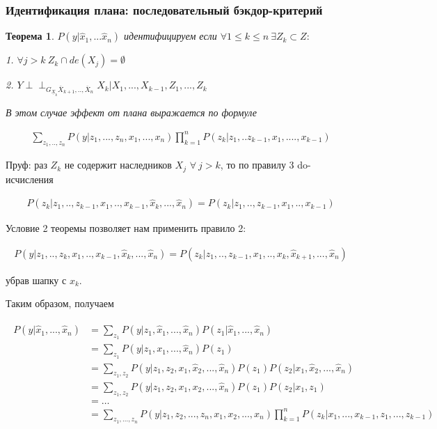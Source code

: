 \documentclass[fleqn]{article}
\newcommand{\independent}{\perp \!\!\! \perp}
\newtheorem{theorem}{Теорема}
\numberwithin{equation}{section}
\numberwithin{theorem}{section}
\numberwithin{figure}{section}
\numberwithin{lemma}{section}
\begin{document}
\subsubsection*{Идентификация плана: последовательный бэкдор-критерий}

\begin{theorem}
	$P(y|\hat x_1, ...\hat x_n)$ идентифицируем если $\forall 1 \le k \le n \ \exists Z_k \subset Z:$ 
	
	1. $ \forall j > k \ Z_k \cap de(X_j) = \emptyset$
	
	2. $Y \independent_{G_{\underline{X}_k}\overline{X}_{k+1},..,\overline{X}_n} X_k | X_1, ..., X_{k-1}, Z_1, ..., Z_k$
	
	В этом случае эффект от плана выражается по формуле 
	
	\begin{align}
		\sum\limits_{z_1,..,z_n}P(y|z_1,...,z_n,x_1,...,x_n)\prod\limits_{k=1}^nP(z_k|z_1,..z_{k-1}, x_1,....,x_{k-1})
	\end{align}
\end{theorem}

Пруф: раз $Z_k$ не содержит наследников $X_j$ $\forall \ j > k$, то по правилу 3 do-исчисления

\begin{align}
	P(z_k|z_1,..,z_{k-1},x_1,..,x_{k-1}, \hat x_k, ...,\hat x_n) = P(z_k|z_1,..,z_{k-1},x_1,..,x_{k-1}) 
\end{align}

Условие 2 теоремы позволяет нам применить правило 2:

\begin{align}
	P(y|z_1,..,z_{k},x_1,..,x_{k-1}, \hat x_k, ...,\hat x_n) = P(z_k|z_1,..,z_{k-1},x_1,..,x_k,\hat x_{k+1},...,\hat x_n) 
\end{align}

убрав шапку с $x_k$.

Таким образом, получаем 

\begin{align}
	\begin{split}
	P(y|\hat x_1,...,\hat x_n) &= \sum\limits_{z_1}P(y|z_1,\hat x_1,...,\hat x_n)P(z_1|\hat x_1,...,\hat x_n) \\
	&=  \sum\limits_{z_1}P(y|z_1, x_1,...,\hat x_n)P(z_1) \\
	&= \sum\limits_{z_1,z_2}P(y|z_1, z_2, x_1, \hat x_2,...,\hat x_n)P(z_1)P(z_2|x_1,\hat x_2,...,\hat x_n) \\
	&=\sum\limits_{z_1,z_2}P(y|z_1, z_2, x_1, x_2,...,\hat x_n)P(z_1)P(z_2|x_1,z_1)\\
	&= \ldots \\
	&= \sum\limits_{z_1,...,z_n}P(y|z_1, z_2, ..., z_n, x_1, x_2,...,x_n)\prod\limits_{k=1}^nP(z_k|x_1,...,x_{k-1},z_1,...,z_{k-1})
	\end{split}
\end{align}
\end{document}
